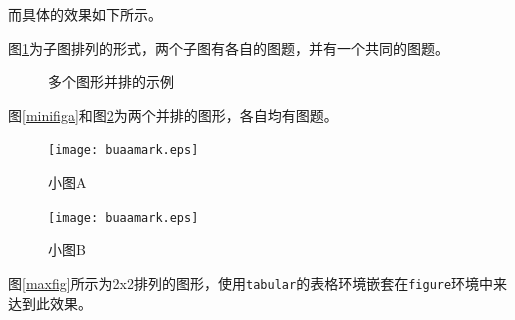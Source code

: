 而具体的效果如下所示。\par
图\ref{subfig1}为子图排列的形式，两个子图有各自的图题，并有一个共同的图题。\par
\begin{figure}[htb]
\begin{center}
    \hspace{7em}
    \caption{多个图形并排的示例}
    \label{subfig1}
\end{center}
\end{figure}
图\ref{minifiga}和图\ref{minifigb}为两个并排的图形，各自均有图题。\par
\begin{figure}[htb]
\begin{minipage}{0.5\textwidth}
    \centering
    \texttt{[image: buaamark.eps]}
    \caption{小图A}
    \label{minifiga}
\end{minipage}
\begin{minipage}{0.5\textwidth}
    \centering
    \texttt{[image: buaamark.eps]}
    \caption{小图B}
    \label{minifigb}
\end{minipage}
\end{figure}
图\ref{maxfig}所示为2x2排列的图形，使用\texttt{tabular}的表格环境嵌套在\texttt{figure}环境中来达到此效果。\par
